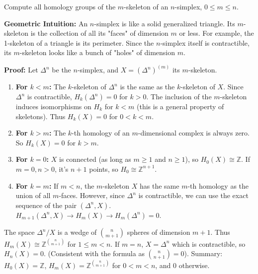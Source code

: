 \begin{exercise}
\label{geometry:2011:8}
Compute all homology groups of the $m$-skeleton of an $n$-simplex, $0 \leq m \leq n$.
\end{exercise}

\begin{solution}
\textbf{Geometric Intuition:} An $n$-simplex is like a solid generalized triangle. Its $m$-skeleton is the collection of all its "faces" of dimension $m$ or less. For example, the 1-skeleton of a triangle is its perimeter. Since the $n$-simplex itself is contractible, its $m$-skeleton looks like a bunch of "holes" of dimension $m$.

\textbf{Proof:} Let $\Delta^n$ be the $n$-simplex, and $X = (\Delta^n)^{(m)}$ its $m$-skeleton.
\begin{enumerate}
    \item \textbf{For $k < m$:} The $k$-skeleton of $\Delta^n$ is the same as the $k$-skeleton of $X$. Since $\Delta^n$ is contractible, $H_k(\Delta^n) = 0$ for $k > 0$. The inclusion of the $m$-skeleton induces isomorphisms on $H_k$ for $k < m$ (this is a general property of skeletons). Thus $H_k(X) = 0$ for $0 < k < m$.
    \item \textbf{For $k > m$:} The $k$-th homology of an $m$-dimensional complex is always zero. So $H_k(X) = 0$ for $k > m$.
    \item \textbf{For $k = 0$:} $X$ is connected (as long as $m \geq 1$ and $n \geq 1$), so $H_0(X) \cong \mathbb{Z}$. If $m=0, n>0$, it's $n+1$ points, so $H_0 \cong \mathbb{Z}^{n+1}$.
    \item \textbf{For $k = m$:} If $m < n$, the $m$-skeleton $X$ has the same $m$-th homology as the union of all $m$-faces. However, since $\Delta^n$ is contractible, we can use the exact sequence of the pair $(\Delta^n, X)$. $H_{m+1}(\Delta^n, X) \to H_m(X) \to H_m(\Delta^n) = 0$.
\end{enumerate}
The space $\Delta^n / X$ is a wedge of $\binom{n}{m+1}$ spheres of dimension $m+1$.
Thus $H_m(X) \cong \mathbb{Z}^{\binom{n}{m+1}}$ for $1 \leq m < n$.
If $m = n$, $X = \Delta^n$ which is contractible, so $H_n(X) = 0$. (Consistent with the formula as $\binom{n}{n+1} = 0$).
Summary: $H_0(X) = \mathbb{Z}$, $H_m(X) = \mathbb{Z}^{\binom{n}{m+1}}$ for $0 < m < n$, and $0$ otherwise.
\end{solution}

